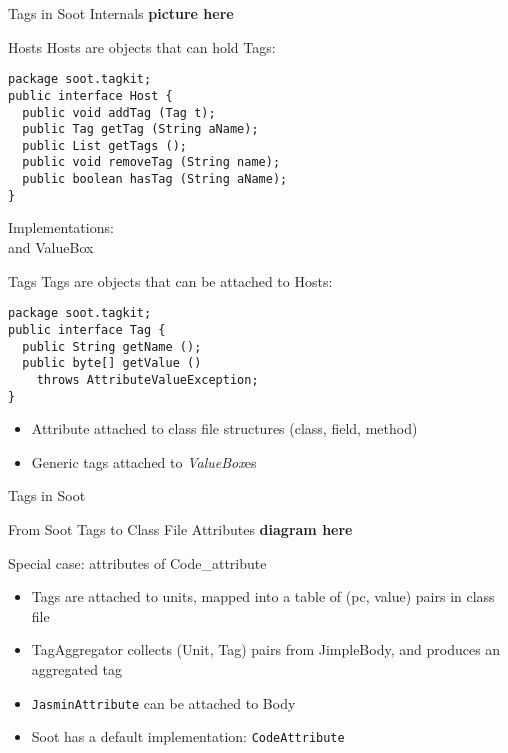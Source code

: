 \begin{slide}{Tags in Soot Internals}
{\bf picture here}
\end{slide}

\begin{slide}{Hosts}
{\red Host}s are objects that can hold {\red Tag}s:
{\small
\begin{verbatim}
package soot.tagkit;
public interface Host {
  public void addTag (Tag t); 
  public Tag getTag (String aName); 
  public List getTags ();
  public void removeTag (String name); 
  public boolean hasTag (String aName); 
}   
\end{verbatim}
}
Implementations:\\
 and {\small ValueBox}
\end{slide}

\begin{slide}{Tags}
{\red Tag}s are objects that can be attached to {\red Host}s:
\small{
\begin{verbatim}
package soot.tagkit;
public interface Tag {
  public String getName ();  
  public byte[] getValue () 
    throws AttributeValueException; 
}
\end{verbatim}
}
\begin{itemize}
\item {\red Attribute} attached to class file structures (class, field, method)
\item Generic tags attached to {\em ValueBox}es
\end{itemize}
\end{slide}



\begin{slide}{Tags in Soot}
\end{slide}

\begin{slide}{From Soot Tags to Class File Attributes}
{\bf diagram here}
\end{slide}


\begin{slide}{Special case: attributes of Code\_attribute}
\begin{itemize}
\item Tags are attached to units, mapped into a table of (pc, value) pairs
      in class file
\item {\red TagAggregator} collects (Unit, Tag) pairs from JimpleBody, and
      produces an aggregated tag 
\item {\tt JasminAttribute} can be attached to Body
\item Soot has a default implementation: {\tt CodeAttribute}
\end{itemize}
\end{slide}

